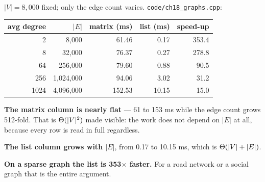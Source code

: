 \begin{worked}
$|V| = 8{,}000$ fixed; only the edge count varies.
\texttt{code/ch18\_graphs.cpp}:

\begin{center}
\begin{tabular}{@{}rrrrr@{}}
\toprule
\rowcolor{primary!15}
avg degree & $|E|$ & matrix (ms) & list (ms) & speed-up \\
\midrule
   2 &     8{,}000 &  61.46 &  0.17 & 353.4 \\
   8 &    32{,}000 &  76.37 &  0.27 & 278.8 \\
  64 &   256{,}000 &  79.60 &  0.88 &  90.5 \\
 256 & 1{,}024{,}000 &  94.06 &  3.02 &  31.2 \\
1024 & 4{,}096{,}000 & 152.53 & 10.15 &  15.0 \\
\bottomrule
\end{tabular}
\end{center}

\smallskip
\textbf{The matrix column is nearly flat} --- 61 to 153 ms while the edge count
grows 512-fold. That is $\Theta(|V|^{2})$ made visible: the work does not
depend on $|E|$ at all, because every row is read in full regardless.

\smallskip
\textbf{The list column grows with $|E|$}, from 0.17 to 10.15 ms, which is
$\Theta(|V|+|E|)$.

\smallskip
\textbf{On a sparse graph the list is 353$\times$ faster.} For a road network
or a social graph that is the entire argument.
\end{worked}

